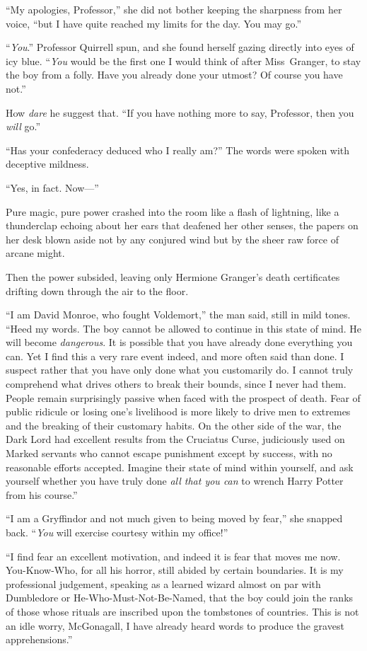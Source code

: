 “My apologies, Professor,” she did not bother keeping the sharpness from her voice, “but I have quite reached my limits for the day. You may go.”

“\emph{You}.” Professor Quirrell spun, and she found herself gazing directly into eyes of icy blue. “\emph{You} would be the first one I would think of after Miss~Granger, to stay the boy from a folly. Have you already done your utmost? Of course you have not.”

How \emph{dare} he suggest that. “If you have nothing more to say, Professor, then you \emph{will} go.”

“Has your confederacy deduced who I really am?” The words were spoken with deceptive mildness.

“Yes, in fact. Now—”

Pure magic, pure power crashed into the room like a flash of lightning, like a thunderclap echoing about her ears that deafened her other senses, the papers on her desk blown aside not by any conjured wind but by the sheer raw force of arcane might.

Then the power subsided, leaving only Hermione Granger’s death certificates drifting down through the air to the floor.

“I am David Monroe, who fought Voldemort,” the man said, still in mild tones. “Heed my words. The boy cannot be allowed to continue in this state of mind. He will become \emph{dangerous}. It is possible that you have already done everything you can. Yet I find this a very rare event indeed, and more often said than done. I suspect rather that you have only done what you customarily do. I cannot truly comprehend what drives others to break their bounds, since I never had them. People remain surprisingly passive when faced with the prospect of death. Fear of public ridicule or losing one’s livelihood is more likely to drive men to extremes and the breaking of their customary habits. On the other side of the war, the Dark Lord had excellent results from the Cruciatus Curse, judiciously used on Marked servants who cannot escape punishment except by success, with no reasonable efforts accepted. Imagine their state of mind within yourself, and ask yourself whether you have truly done \emph{all that you can} to wrench Harry Potter from his course.”

“I am a Gryffindor and not much given to being moved by fear,” she snapped back. “\emph{You} will exercise courtesy within my office!”

“I find fear an excellent motivation, and indeed it is fear that moves me now. You-Know-Who, for all his horror, still abided by certain boundaries. It is my professional judgement, speaking as a learned wizard almost on par with Dumbledore or He-Who-Must-Not-Be-Named, that the boy could join the ranks of those whose rituals are inscribed upon the tombstones of countries. This is not an idle worry, McGonagall, I have already heard words to produce the gravest apprehensions.”

